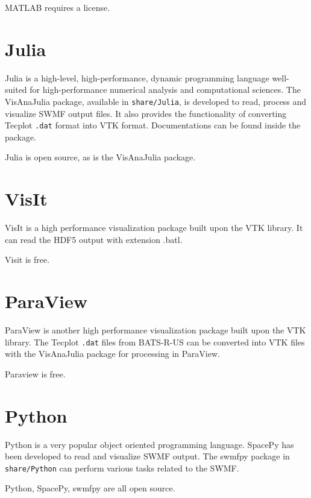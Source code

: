 MATLAB requires a license.

\section{Julia}

Julia is a high-level, high-performance, dynamic programming language
well-suited for high-performance numerical analysis and computational sciences.
The VisAnaJulia package, available in {\tt share/Julia}, is developed to read,
process and visualize SWMF output files.
It also provides the functionality of converting Tecplot \verb|.dat| format
into VTK format.
Documentations can be found inside the package.

Julia is open source, as is the VisAnaJulia package.

\section{VisIt}

VisIt is a high performance visualization package built upon the VTK library.
It can read the HDF5 output with extension .batl.

Visit is free.

\section{ParaView}

ParaView is another high performance visualization package built upon the VTK
library.
The Tecplot \verb|.dat| files from BATS-R-US can be converted into VTK files
with the VisAnaJulia package for processing in ParaView.

Paraview is free.

\section{Python}

Python is a very popular object oriented programming language. 
SpacePy has been developed to read and visualize SWMF output. 
The swmfpy package in {\tt share/Python} 
can perform various tasks related to the SWMF. 

Python, SpacePy, swmfpy are all open source.

